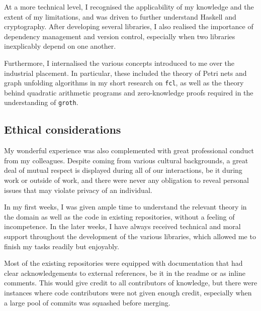 \documentclass[11pt]{article}
\begin{document}
At a more technical level, I recognised the applicability of my knowledge and the extent of my limitations, and was driven to further understand Haskell and cryptography. After developing several libraries, I also realised the importance of dependency management and version control, especially when two libraries inexplicably depend on one another.

Furthermore, I internalised the various concepts introduced to me over the industrial placement. In particular, these included the theory of Petri nets and graph unfolding algorithms in my short research on \texttt{fcl}, as well as the theory behind quadratic arithmetic programs and zero-knowledge proofs required in the understanding of \texttt{groth}.

\subsection{Ethical considerations}

My wonderful experience was also complemented with great professional conduct from my colleagues. Despite coming from various cultural backgrounds, a great deal of mutual respect is displayed during all of our interactions, be it during work or outside of work, and there were never any obligation to reveal personal issues that may violate privacy of an individual.

In my first weeks, I was given ample time to understand the relevant theory in the domain as well as the code in existing repositories, without a feeling of incompetence. In the later weeks, I have always received technical and moral support throughout the development of the various libraries, which allowed me to finish my tasks readily but enjoyably.

Most of the existing repositories were equipped with documentation that had clear acknowledgements to external references, be it in the readme or as inline comments. This would give credit to all contributors of knowledge, but there were instances where code contributors were not given enough credit, especially when a large pool of commits was squashed before merging.

\pagebreak
\end{document}
